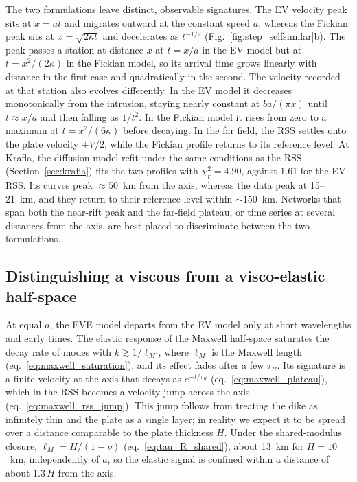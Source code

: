 \documentclass[extra]{gji}
\begin{document}
The two formulations leave distinct, observable signatures.  The EV
velocity peak sits at $x = at$ and migrates outward at the constant speed
$a$, whereas the Fickian peak sits at $x = \sqrt{2\kappa t}$ and
decelerates as $t^{-1/2}$ (Fig.~\ref{fig:step_selfsimilar}b).  The peak
passes a station at distance $x$ at $t = x/a$ in the EV model
but at $t = x^2/(2\kappa)$ in the Fickian model, so its arrival time grows
linearly with distance in the first case and quadratically in the second.
The velocity recorded at that station also evolves differently.  In the
EV model it decreases monotonically from the intrusion, staying nearly
constant at $ba/(\pi x)$ until $t \approx x/a$ and then falling as
$1/t^2$.  In the Fickian model it rises from zero to a maximum at
$t = x^2/(6\kappa)$ before decaying.  In the far
field, the RSS settles onto the plate velocity $\pm V/2$, while the
Fickian profile returns to its reference level.  At Krafla, the diffusion
model refit under the same conditions as the RSS
(Section~\ref{sec:krafla}) fits the two profiles with $\chi^2_r = 4.90$,
against 1.61 for the EV RSS.  Its curves peak $\approx50$~km from the axis, whereas the data peak at
15--21~km, and they return to their reference level within $\sim150$~km.
Networks that span both the near-rift peak and the far-field plateau,
or time series at several distances from the axis, are best
placed to discriminate between the two formulations.

\subsection{Distinguishing a viscous from a visco-elastic half-space}
\label{sec:disc_eve}

At equal $a$, the EVE model departs from the EV model only at short
wavelengths and early times.  The elastic response of the Maxwell
half-space saturates the decay rate of modes with $k \gtrsim 1/\ell_M$,
where $\ell_M$ is the Maxwell length
(eq.~\ref{eq:maxwell_saturation}), and its
effect fades after a few $\tau_R$.  Its signature is a finite velocity at
the axis that decays as $e^{-t/\tau_R}$ (eq.~\ref{eq:maxwell_plateau}),
which in the RSS becomes a velocity jump across the axis
(eq.~\ref{eq:maxwell_rss_jump}).  This jump follows from treating the
dike as infinitely thin and the plate as a single layer; in reality we
expect it to be spread over a distance comparable to the plate thickness
$H$.  Under the shared-modulus closure,
$\ell_M = H/(1-\nu)$ (eq.~\ref{eq:tau_R_shared}), about 13~km for
$H = 10$~km, independently of $a$, so the elastic signal is confined within a
distance of about $1.3\,H$ from the axis.
\end{document}
